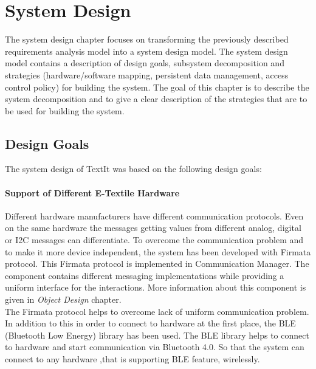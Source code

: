 
\chapter{System Design}
	The system design chapter focuses on transforming the previously described requirements analysis model into a system design model. The system design model contains a description of design goals, subsystem decomposition and strategies (hardware/software mapping, persistent data management, access control policy) for building the system. The goal of this chapter is to describe the system decomposition and to give a clear description of the strategies that are to be used for building the system. 
	
\section{Design Goals}
The system design of TextIt was based on the following design goals:


	\subsubsection{Support of Different E-Textile Hardware} 
Different hardware manufacturers have different communication protocols. Even on the same hardware the messages getting values from different analog, digital or I2C messages can differentiate. To overcome the communication problem and to make it more device independent, the system has been developed with Firmata protocol. This Firmata protocol is implemented in Communication Manager. The component contains different messaging implementations while providing a uniform interface for the interactions. More information about this component is given in \textit{Object Design} chapter.\\

The Firmata protocol helps to overcome lack of uniform communication problem. In addition to this in order to connect to hardware at the first place, the BLE (Bluetooth Low Energy) library has been used. The BLE library helps to connect to hardware and start communication via Bluetooth 4.0. So that the system can connect to any hardware ,that is supporting BLE feature, wirelessly.

